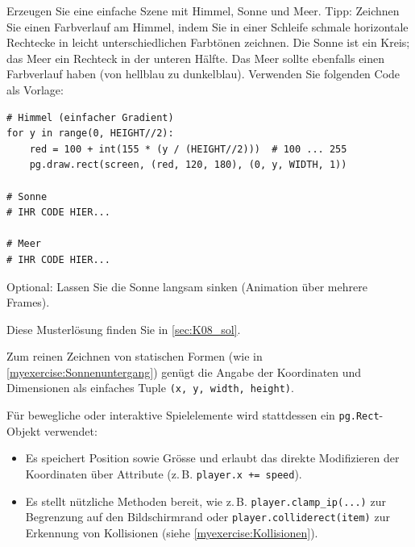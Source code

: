 \begin{myexercise}\label{myexercise:Sonnenuntergang}
    Erzeugen Sie eine einfache Szene mit Himmel, Sonne und Meer. Tipp: Zeichnen Sie einen Farbverlauf am Himmel, indem Sie in einer Schleife schmale horizontale Rechtecke in leicht unterschiedlichen Farbtönen zeichnen. Die Sonne ist ein Kreis; das Meer ein Rechteck in der unteren Hälfte. Das Meer sollte ebenfalls einen Farbverlauf haben (von hellblau zu dunkelblau). Verwenden Sie folgenden Code als Vorlage:
    \begin{lstlisting}
# Himmel (einfacher Gradient)
for y in range(0, HEIGHT//2):
	red = 100 + int(155 * (y / (HEIGHT//2)))  # 100 ... 255
	pg.draw.rect(screen, (red, 120, 180), (0, y, WIDTH, 1))

# Sonne
# IHR CODE HIER...

# Meer
# IHR CODE HIER...
\end{lstlisting}
    Optional: Lassen Sie die Sonne langsam sinken (Animation über mehrere Frames).
	\begin{myanswer}
		Diese Musterlösung finden Sie in \cref{sec:K08_sol}.
	\end{myanswer}
\end{myexercise}

\begin{myremark}
    Zum reinen Zeichnen von statischen Formen (wie in \cref{myexercise:Sonnenuntergang}) genügt die Angabe der Koordinaten und Dimensionen als einfaches Tuple \lstinline|(x, y, width, height)|.

    Für bewegliche oder interaktive Spielelemente wird stattdessen ein \lstinline|pg.Rect|-Objekt verwendet:
    \begin{itemize}
        \item Es speichert Position sowie Grösse und erlaubt das direkte Modifizieren der Koordinaten über Attribute (z.\,B. \lstinline|player.x += speed|).
        \item Es stellt nützliche Methoden bereit, wie z.\,B. \lstinline|player.clamp_ip(...)| zur Begrenzung auf den Bildschirmrand oder \lstinline|player.colliderect(item)| zur Erkennung von Kollisionen (siehe \cref{myexercise:Kollisionen}).
    \end{itemize}
\end{myremark}

